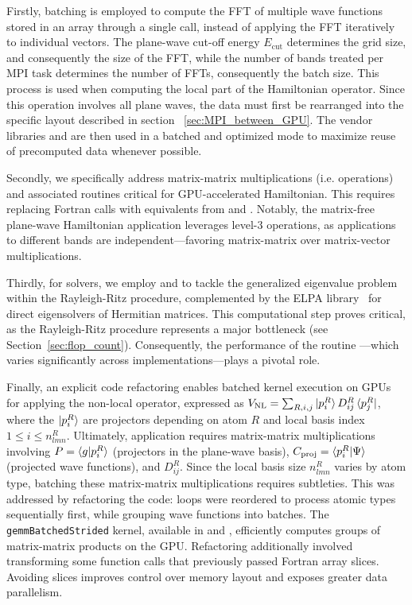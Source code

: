 \documentclass[twocolumn,superscriptaddress]{revtex4-1}
\begin{document}
Firstly, batching is employed to compute the FFT of multiple wave functions stored in an array through a single call, instead of applying the FFT iteratively to individual vectors. The plane-wave cut-off energy $E_{\text{cut}}$ determines the grid size, and consequently the size of the FFT, while the number of bands treated per MPI task determines the number of FFTs, consequently the batch size. This process is used when computing the local part of the Hamiltonian operator. Since this operation involves all plane waves, the data must first be rearranged into the specific layout described in section ~\ref{sec:MPI_between_GPU}. The vendor libraries \cufft \cite{cufft} and \rocfft \cite{rocfft} are then used in a batched and optimized mode to maximize reuse of precomputed data whenever possible.

Secondly, we specifically address matrix-matrix multiplications (i.e. \gemm operations) and associated routines critical for GPU-accelerated Hamiltonian. This requires replacing Fortran \blas \gemm calls with equivalents from \cublas \cite{cublas} and \rocblas \cite{rocblas}. Notably, the matrix-free plane-wave Hamiltonian application leverages level-3 \blas operations, as applications to different bands are independent—favoring matrix-matrix over matrix-vector multiplications.

Thirdly, for solvers, we employ \cusolver \cite{cusolver} and \rocsolver \cite{rocsolver} to tackle the generalized eigenvalue problem within the Rayleigh-Ritz procedure, complemented by the ELPA library~\cite{marek2014elpa} for direct eigensolvers of Hermitian matrices. This computational step proves critical, as the Rayleigh-Ritz procedure represents a major bottleneck (see Section~\ref{sec:flop_count}). Consequently, the performance of the \lapack routine \hegvd—which varies significantly across implementations—plays a pivotal role.


Finally, an explicit code refactoring enables batched kernel execution on GPUs for applying the non-local operator, expressed as $V_{\text{NL}}=\sum_{R,i,j}{\ket{p^R_i}D^R_{ij}\bra{p^R_j}}$, where the $\ket{p^R_i}$ are projectors depending on atom $R$ and local basis index $1\leq i\leq n^R_{lmn}$. Ultimately,  application requires matrix-matrix multiplications involving $P=\braket{g|p^R_i}$ (projectors in the plane-wave basis), $C_{\text{proj}}=\braket{p^R_i|\Psi}$ (projected wave functions), and $D^R_{ij}$. Since the local basis size $n^R_{lmn}$ varies by atom type, batching these matrix-matrix multiplications requires subtleties. This was addressed by refactoring the code: loops were reordered to process atomic types sequentially first, while grouping wave functions into batches. The \texttt{gemmBatchedStrided} kernel, available in \cublas and \rocblas, efficiently computes groups of matrix-matrix products on the GPU. Refactoring additionally involved transforming some function calls that previously passed Fortran array slices. Avoiding slices improves control over memory layout and exposes greater data parallelism.
\end{document}
